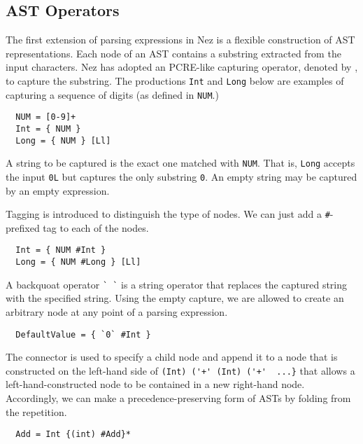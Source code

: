 \documentclass[preprint]{sigplanconf}
\begin{document}
\subsection{AST Operators}

The first extension of parsing expressions in Nez is a flexible construction of AST representations. Each node of an AST contains a substring extracted from the input characters. Nez has adopted an PCRE-like capturing operator, denoted by , to capture the substring. The productions {\tt Int} and {\tt Long} below are examples of capturing a sequence of digits (as defined in {\tt NUM}.)

\begin{verbatim}
  NUM = [0-9]+
  Int = { NUM }
  Long = { NUM } [Ll]
\end{verbatim}

A string to be captured is the exact one matched with {\tt NUM}. That is, {\tt Long} accepts the input \verb|0L| but captures the only substring \verb|0|. An empty string may be captured by an empty expression. 

Tagging is introduced to distinguish the type of nodes. We can just add a \verb|#|-prefixed tag to each of the nodes. 

\begin{verbatim}
  Int = { NUM #Int }
  Long = { NUM #Long } [Ll]
\end{verbatim}

A backquoat operator \verb|` `| is a string operator that replaces the captured string with the specified string. Using the empty capture, we are allowed to create an arbitrary node at any point of a parsing expression.  

\begin{verbatim}
  DefaultValue = { `0` #Int }
\end{verbatim}

The connector \verb|| is used to specify a child node and append it to a node that is constructed on  the left-hand side of \verb|(Int) ('+' (Int) ('+'  ...}| that allows a left-hand-constructed node to be contained in a new right-hand node. Accordingly, we can make a precedence-preserving form of ASTs by folding from the repetition. 

\begin{verbatim}
  Add = Int {(int) #Add}* 
\end{verbatim}
\end{document}
